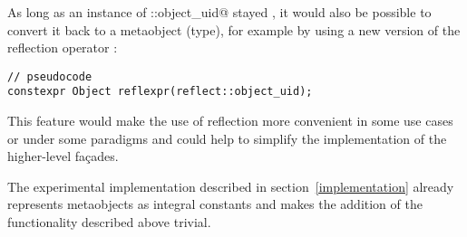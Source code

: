 As long as an instance of \verb@reflect::object_uid@ stayed \verb@constexpr@, it would
also be possible to convert it back to a metaobject (type), for example by using
a new version of the reflection operator \verb@reflexpr@:

\begin{verbatim}
// pseudocode
constexpr Object reflexpr(reflect::object_uid);
\end{verbatim}

This feature would make the use of reflection more convenient in some use cases
or under some paradigms and could help to simplify the implementation of the
higher-level fa\c{c}ades.

The experimental implementation described in section~\ref{implementation}
already represents metaobjects as integral constants and makes the addition
of the functionality described above trivial.

